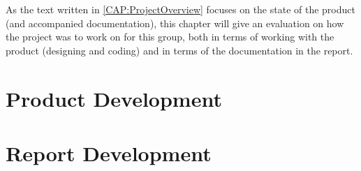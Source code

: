 As the text written in \autoref{CAP:ProjectOverview} focuses on the state of the product (and accompanied documentation), this chapter will give an evaluation on how the project was to work on for this group, both in terms of working with the product (designing and coding) and in terms of the documentation in the report.

\section{Product Development}


\section{Report Development}
